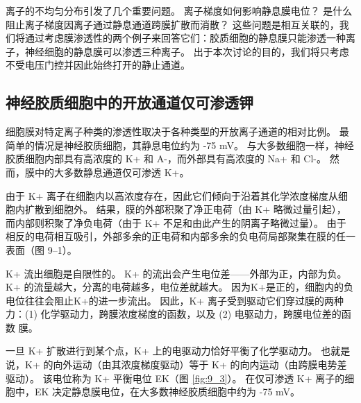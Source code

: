 离子的不均匀分布引发了几个重要问题。 
离子梯度如何影响静息膜电位？ 
是什么阻止离子梯度因离子通过静息通道跨膜扩散而消散？ 
这些问题是相互关联的，我们将通过考虑膜渗透性的两个例子来回答它们：胶质细胞的静息膜只能渗透一种离子，神经细胞的静息膜可以渗透三种离子。 
出于本次讨论的目的，我们将只考虑不受电压门控并因此始终打开的静止通道。






\subsection{神经胶质细胞中的开放通道仅可渗透钾}
细胞膜对特定离子种类的渗透性取决于各种类型的开放离子通道的相对比例。 
最简单的情况是神经胶质细胞，其静息电位约为 -75 mV。 
与大多数细胞一样，神经胶质细胞内部具有高浓度的 K+ 和 A-，而外部具有高浓度的 Na+ 和 Cl-。 
然而，膜中的大多数静息通道仅可渗透 K+。


由于 K+ 离子在细胞内以高浓度存在，因此它们倾向于沿着其化学浓度梯度从细胞内扩散到细胞外。 
结果，膜的外部积聚了净正电荷（由 K+ 略微过量引起），而内部则积聚了净负电荷（由于 K+ 不足和由此产生的阴离子略微过量）。 
由于相反的电荷相互吸引，外部多余的正电荷和内部多余的负电荷局部聚集在膜的任一表面（图 9–1）。


K+ 流出细胞是自限性的。 
K+ 的流出会产生电位差——外部为正，内部为负。 
K+ 的流量越大，分离的电荷越多，电位差就越大。 
因为K+是正的，细胞内的负电位往往会阻止K+的进一步流出。 
因此，K+ 离子受到驱动它们穿过膜的两种力：(1) 化学驱动力，跨膜浓度梯度的函数，以及 (2) 电驱动力，跨膜电位差的函数 膜。


一旦 K+ 扩散进行到某个点，K+ 上的电驱动力恰好平衡了化学驱动力。 
也就是说，K+ 的向外运动（由其浓度梯度驱动）等于 K+ 的向内运动（由跨膜电势差驱动）。 
该电位称为 K+ 平衡电位 EK（图 \ref{fig:9_3}）。 
在仅可渗透 K+ 离子的细胞中，EK 决定静息膜电位，在大多数神经胶质细胞中约为 -75 mV。


